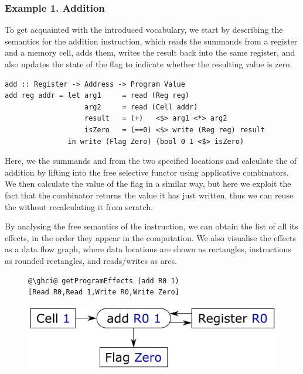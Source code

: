 \vspace{-1mm}
\subsubsection{Example 1. Addition}
To get acquainted with the introduced vocabulary, we start by describing the
semantics for the addition instruction, which reads the summands from a
register and a memory cell, adds them, writes the result back into the same
register, and also updates the state of the  flag to indicate whether
the resulting value is zero.

\vspace{1mm}
\begin{verbatim}
add :: Register -> Address -> Program Value
add reg addr = let arg1     = read (Reg reg)
                   arg2     = read (Cell addr)
                   result   = (+)   <$> arg1 <*> arg2
                   isZero   = (==0) <$> write (Reg reg) result
               in write (Flag Zero) (bool 0 1 <$> isZero)
\end{verbatim}
\vspace{1mm}

\noindent
Here, we  the summands  and  from the two specified
locations and calculate the  of addition by lifting \hs{(+)} into the
free selective functor using applicative combinators. We then calculate the
value of the  flag in a similar way, but here we exploit the fact that
the  combinator returns the value it has just written, thus we can
reuse the  without recalculating it from scratch.

By analysing the free semantics of the  instruction, we can obtain the
list of all its effects, in the order they appear in the computation. We also
visualise the effects as a data flow graph, where data locations are shown as
rectangles, instructions as rounded rectangles, and reads/writes as arcs.


\begin{figure}[!h]
\begin{minipage}{0.53\textwidth}
\raggedleft
\begin{verbatim}
@\ghci@ getProgramEffects (add R0 1)
[Read R0,Read 1,Write R0,Write Zero]
\end{verbatim}
 \end{minipage}
 \begin{minipage}{0.44\textwidth}
  \centering
  \includegraphics[scale=0.3]{fig/add.pdf}
 \end{minipage}
\end{figure}


